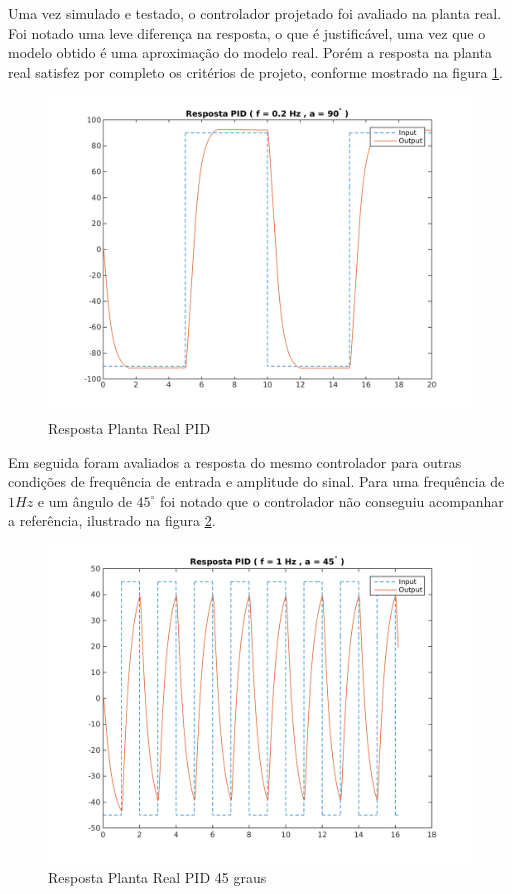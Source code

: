 \documentclass[a4paper,11pt]{article}
\begin{document}
Uma vez simulado e testado, o controlador projetado foi avaliado na planta real. Foi notado uma leve diferença na resposta, o que é justificável, uma vez que o modelo obtido é uma aproximação do modelo real. Porém a resposta na planta real satisfez por completo os critérios de projeto, conforme mostrado na figura \ref{fig:quaser_pid}.

\begin{figure}[H]
    \centering
    \includegraphics[width=0.8\linewidth]{tex/img/quanserpid_s90num5.png}
    \caption{Resposta Planta Real PID}
    \label{fig:quaser_pid}
\end{figure}

Em seguida foram avaliados a resposta do mesmo controlador para outras condições de frequência de entrada e amplitude do sinal. Para uma frequência de $1Hz$ e um ângulo de $45^\circ$ foi notado que o controlador não conseguiu acompanhar a referência, ilustrado na figura \ref{fig:quanserpid_s45num1}.

\begin{figure}[H]
    \centering
    \includegraphics[width=0.8\linewidth]{tex/img/quanserpid_s45num1.png}
    \caption{Resposta Planta Real PID 45 graus}
    \label{fig:quanserpid_s45num1}
\end{figure}
\end{document}
